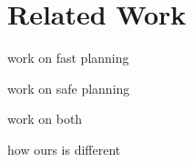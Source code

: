 \section{Related Work \label{sec:relatedwork}}
work on fast planning

work on safe planning

work on both

how ours is different